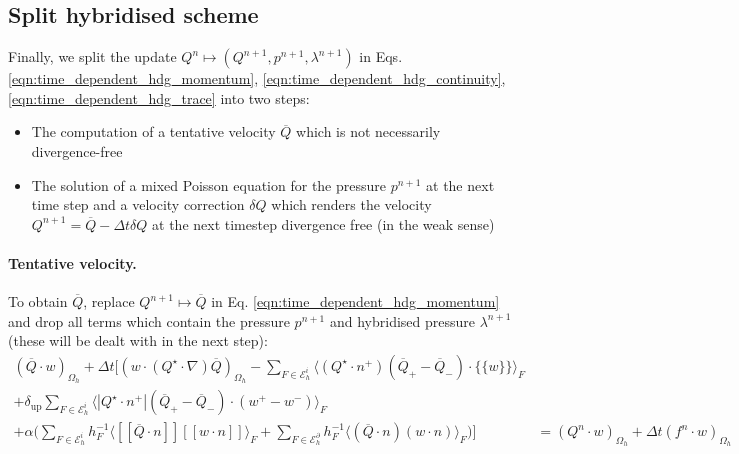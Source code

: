 \documentclass[11pt]{article}
\newcommand{\jump}[1]{[\![ #1]\!]}
\newcommand{\avg}[1]{\{\!\{#1\}\!\}}
\begin{document}
\subsection{Split hybridised scheme}\label{sec:split_hybridised}
Finally, we split the update $Q^{n} \mapsto (Q^{n+1},p^{n+1},\lambda^{n+1})$ in Eqs. \eqref{eqn:time_dependent_hdg_momentum}, \eqref{eqn:time_dependent_hdg_continuity}, \eqref{eqn:time_dependent_hdg_trace} into two steps:
\begin{itemize}
    \item The computation of a tentative velocity $\overline{Q}$ which is not necessarily divergence-free
    \item The solution of a mixed Poisson equation for the pressure $p^{n+1}$ at the next time step and a velocity correction $\delta Q$ which renders the velocity $Q^{n+1} = \overline{Q}-\Delta t \delta Q$ at the next timestep divergence free (in the weak sense)
\end{itemize}
\paragraph{Tentative velocity.}
To obtain $\overline{Q}$, replace $Q^{n+1} \mapsto \overline{Q}$ in Eq. \eqref{eqn:time_dependent_hdg_momentum} and drop all terms which contain the pressure $p^{n+1}$ and hybridised pressure $\lambda^{n+1}$ (these will be dealt with in the next step):
\begin{equation}
    \begin{aligned}
        (\overline{Q}\cdot w)_{\Omega_h} + \Delta t\Big[  \left(w\cdot (Q^\star\cdot \nabla) \overline{Q}\right)_{\Omega_h}  -\sum_{F\in\mathcal{E}_h^i} \langle (Q^\star \cdot n^+)(\overline{Q}_+ - \overline{Q}_-)\cdot \avg{w}\rangle_F & \\
        +\delta_{\text{up}}\sum_{F\in\mathcal{E}_h^i} \langle \left|Q^\star \cdot n^+\right|(\overline{Q}_+ - \overline{Q}_-)\cdot (w^+-w^-)\rangle_F                                                                                       & \\+ \alpha \Big(\sum_{F\in\mathcal{E}_h^i} h_F^{-1}\langle \jump{\overline{Q}\cdot n} \jump{w\cdot n}\rangle_F                                      +  \sum_{F\in\mathcal{E}_h^\partial} h_F^{-1}\langle (\overline{Q}\cdot n) (w\cdot n)\rangle_F \Big)  \Big]          & = (Q^n\cdot w)_{\Omega_h} + \Delta t (f^n\cdot w)_{\Omega_h}
    \end{aligned}\label{eqn:tentative_velocity}
\end{equation}
\end{document}
